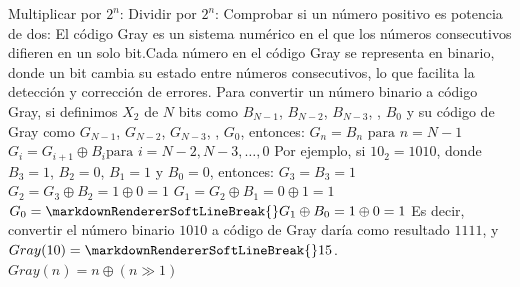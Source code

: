 \markdownRendererUlItem Multiplicar por $2^n$:\markdownRendererUlItemEnd 
\markdownRendererUlItem Dividir por $2^n$:\markdownRendererUlItemEnd 
\markdownRendererUlItem Comprobar si un número positivo es potencia de dos: \markdownRendererUlItemEnd 
\markdownRendererUlEnd \markdownRendererInterblockSeparator
{}\markdownRendererSectionBegin
{}\markdownRendererInterblockSeparator
{}El código Gray es un sistema numérico en el que los números consecutivos difieren en un solo bit.Cada\markdownRendererSoftLineBreak
{}número en el código Gray se representa en binario, donde un bit cambia su estado entre números\markdownRendererSoftLineBreak
{}consecutivos, lo que facilita la detección y corrección de errores.\markdownRendererParagraphSeparator
{}Para convertir un número binario a código Gray, si definimos $X_2$ de $N$ bits como $B_{N-1}$, $B_{N-2}$,\markdownRendererSoftLineBreak
{}$B_{N-3}$, \markdownRendererEllipsis{}, $B_0$ y su código de Gray como $G_{N-1}$, $G_{N-2}$, $G_{N-3}$, \markdownRendererEllipsis{}, $G_0$, entonces:\markdownRendererParagraphSeparator
{}$G_n = B_n \text{ para } n = N-1 $ $G_i = G_{i+1} \oplus B_i \text{para } i = N-2, N-3, \ldots, 0$\markdownRendererParagraphSeparator
{}Por ejemplo, si $10_2 = 1010$, donde $B_3 = 1$, $B_2 = 0$, $B_1 = 1$ y $B_0 = 0$, entonces:\markdownRendererSoftLineBreak
{}$G_3 = B_3 = 1$ $G_2 = G_3 \oplus B_2 = 1 \oplus 0 = 1$ $G_1 = G_2 \oplus B_1 = 0 \oplus 1 = 1$ $G_0 =\markdownRendererSoftLineBreak
{}G_1 \oplus B_0 = 1 \oplus 0 = 1$\markdownRendererSoftLineBreak
{}Es decir, convertir el número binario $1010$ a código de Gray daría como resultado $1111$, y $Gray(10) =\markdownRendererSoftLineBreak
{}15$.\markdownRendererParagraphSeparator
{}$Gray(n) = n \oplus (n \gg 1)$\markdownRendererInterblockSeparator
{}
\markdownRendererSectionEnd 
\markdownRendererSectionEnd 
\markdownRendererSectionEnd 
\markdownRendererSectionEnd \markdownRendererDocumentEnd